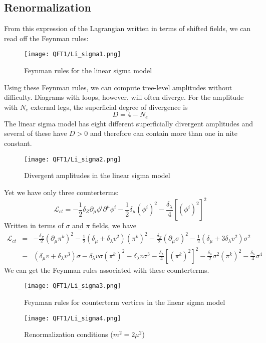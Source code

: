 \subsection{Renormalization}
From this expression of the Lagrangian written in terms of shifted fields, we can read off the Feynman rules:
\begin{figure}[!h]
\centering
\texttt{[image: QFT1/Li\_sigma1.png]}
\caption{Feynman rules for the linear sigma model}
\end{figure}

\noindent
Using these Feynman rules, we can compute tree-level amplitudes without difficulty. 
Diagrams with loops, however, will often diverge. For the amplitude with $N_e$ external legs, the superficial degree of divergence is
\[D = 4 - N_e\]
The linear sigma model has eight different superficially divergent amplitudes and several of these have $D > 0$ and therefore can contain more than one in nite constant.
\begin{figure}[!h]
\centering
\texttt{[image: QFT1/Li\_sigma2.png]}
\caption{Divergent amplitudes in the linear sigma model}
\end{figure}

\noindent
Yet we have only three counterterms:
\[\mathcal{L}_{ct} = -\frac{1}{2} \delta_Z \partial_{\mu} \phi^i \partial^{\mu}\phi^i - \frac{1}{2} \delta_{\mu} (\phi^i)^2 - \frac{\delta_{\lambda}}{4} [(\phi^i)^2]^2 \]
Written in terms of $\sigma$ and $\pi$ fields, we have
\begin{eqnarray}
\mathcal{L}_{ct} &=& -\frac{\delta_Z}{2}(\partial_{\mu}\pi^k)^2 - \frac{1}{2}(\delta_{\mu}+\delta_{\lambda}v^2)(\pi^k)^2 -\frac{\delta_Z}{2}(\partial_{\mu}\sigma)^2 - \frac{1}{2}(\delta_{\mu} + 3\delta_{\lambda}v^2)\sigma^2 \nonumber \\
&-& (\delta_{\mu}v + \delta_{\lambda}v^3)\sigma - \delta_{\lambda}v\sigma(\pi^k)^2 - \delta_{\lambda}v\sigma^3 - \frac{\delta_{\lambda}}{4}[(\pi^k)^2]^2 - \frac{\delta_{\lambda}}{2}\sigma^2 (\pi^k)^2 - \frac{\delta_{\lambda}}{4}\sigma^4 \nonumber
\end{eqnarray}
We can get the Feynman rules associated with these counterterms.
\begin{figure}[!h]
\centering
\texttt{[image: QFT1/Li\_sigma3.png]}
\caption{Feynman rules for counterterm vertices in the linear sigma model}
\end{figure}

\begin{figure}[!h]
\centering
\texttt{[image: QFT1/Li\_sigma4.png]}
\caption{Renormalization conditions ($m^2 = 2\mu^2$)}
\end{figure}

